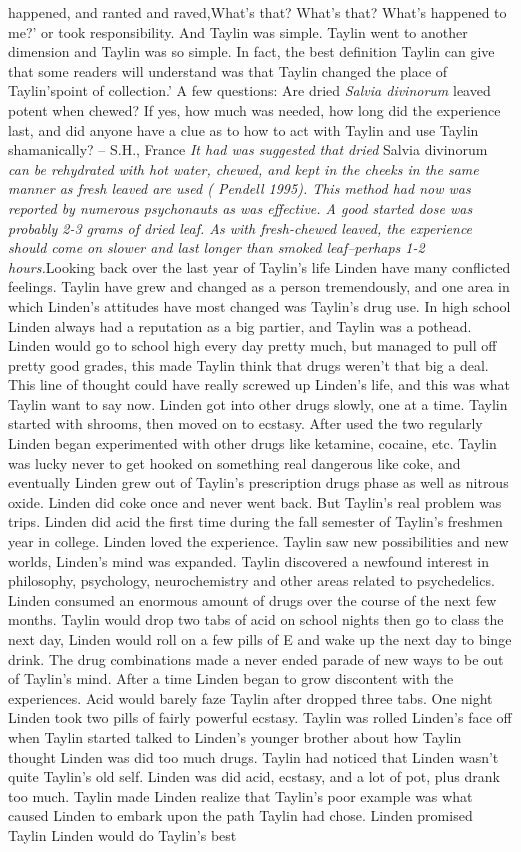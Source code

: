 \documentclass[12pt]{book}
\begin{document}
happened, and ranted and raved,What's that? What's that? What's happened to me?' or took responsibility. And Taylin was simple. Taylin went to another dimension and Taylin was so simple. In fact, the best definition Taylin can give that some readers will understand was that Taylin changed the place of Taylin'spoint of collection.' A few questions: Are dried \emph{Salvia divinorum} leaved potent when chewed? If yes, how much was needed, how long did the experience last, and did anyone have a clue as to how to act with Taylin and use Taylin shamanically? -- S.H., France \emph{It had was suggested that dried} Salvia divinorum \emph{can be rehydrated with hot water, chewed, and kept in the cheeks in the same manner as fresh leaved are used ( Pendell 1995). This method had now was reported by numerous psychonauts as was effective. A good started dose was probably 2-3 grams of dried leaf. As with fresh-chewed leaved, the experience should come on slower and last longer than smoked leaf--perhaps 1-2 hours.}Looking back over the last year of Taylin's life Linden have many conflicted feelings. Taylin have grew and changed as a person tremendously, and one area in which Linden's attitudes have most changed was Taylin's drug use. In high school Linden always had a reputation as a big partier, and Taylin was a pothead. Linden would go to school high every day pretty much, but managed to pull off pretty good grades, this made Taylin think that drugs weren't that big a deal. This line of thought could have really screwed up Linden's life, and this was what Taylin want to say now. Linden got into other drugs slowly, one at a time. Taylin started with shrooms, then moved on to ecstasy. After used the two regularly Linden began experimented with other drugs like ketamine, cocaine, etc. Taylin was lucky never to get hooked on something real dangerous like coke, and eventually Linden grew out of Taylin's prescription drugs phase as well as nitrous oxide. Linden did coke once and never went back. But Taylin's real problem was trips. Linden did acid the first time during the fall semester of Taylin's freshmen year in college. Linden loved the experience. Taylin saw new possibilities and new worlds, Linden's mind was expanded. Taylin discovered a newfound interest in philosophy, psychology, neurochemistry and other areas related to psychedelics. Linden consumed an enormous amount of drugs over the course of the next few months. Taylin would drop two tabs of acid on school nights then go to class the next day, Linden would roll on a few pills of E and wake up the next day to binge drink. The drug combinations made a never ended parade of new ways to be out of Taylin's mind. After a time Linden began to grow discontent with the experiences. Acid would barely faze Taylin after dropped three tabs. One night Linden took two pills of fairly powerful ecstasy. Taylin was rolled Linden's face off when Taylin started talked to Linden's younger brother about how Taylin thought Linden was did too much drugs. Taylin had noticed that Linden wasn't quite Taylin's old self. Linden was did acid, ecstasy, and a lot of pot, plus drank too much. Taylin made Linden realize that Taylin's poor example was what caused Linden to embark upon the path Taylin had chose. Linden promised Taylin Linden would do Taylin's best 
\end{document}
